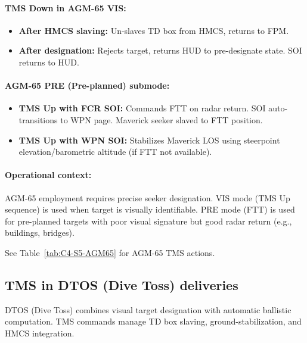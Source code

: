 \documentclass[11pt, a4paper, twoside]{report}
\begin{document}
\paragraph{TMS Down in AGM-65 VIS:}
\begin{itemize}
    \item \textbf{After HMCS slaving:} Un-slaves TD box from HMCS, returns to FPM.
    \item \textbf{After designation:} Rejects target, returns HUD to pre-designate state. SOI returns to HUD.
\end{itemize}

\paragraph{AGM-65 PRE (Pre-planned) submode:}
\begin{itemize}
    \item \textbf{TMS Up with FCR SOI:} Commands FTT on radar return. SOI auto-transitions to WPN page. Maverick seeker slaved to FTT position.
    \item \textbf{TMS Up with WPN SOI:} Stabilizes Maverick LOS using steerpoint elevation/barometric altitude (if FTT not available).
\end{itemize}

\paragraph{Operational context:}
AGM-65 employment requires precise seeker designation. VIS mode (TMS Up sequence) is used when target is visually identifiable. PRE mode (FTT) is used for pre-planned targets with poor visual signature but good radar return (e.g., buildings, bridges).

See Table~\ref{tab:C4-S5-AGM65} for AGM-65 TMS actions.

\subsection{TMS in DTOS (Dive Toss) deliveries}
\label{sec:C4-S5-S2}

DTOS (Dive Toss) combines visual target designation with automatic ballistic computation. TMS commands manage TD box slaving, ground-stabilization, and HMCS integration.
\end{document}
